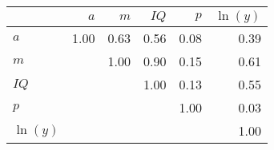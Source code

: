 \begin{tabular}{lrrrrr}
\hline
 & $a$  & $m$  & $IQ$  & $p$  & $\ln(y)$  \\
\hline
$a$ & 1.00  & 0.63  & 0.56  & 0.08  & 0.39  \\
$m$ &   & 1.00  & 0.90  & 0.15  & 0.61  \\
$IQ$ &   &   & 1.00  & 0.13  & 0.55  \\
$p$ &   &   &   & 1.00  & 0.03  \\
$\ln(y)$ &   &   &   &   & 1.00  \\
\hline
\end{tabular}%
